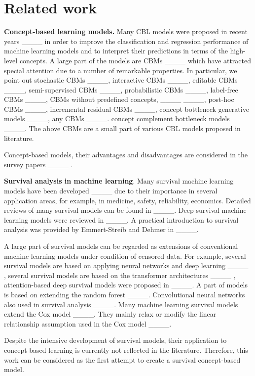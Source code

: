 \section{Related work}
\textbf{Concept-based learning models.} Many CBL models were proposed in
recent years ____
in order to improve the classification and regression performance of machine
learning models and to interpret their predictions in terms of the high-level
concepts. A large part of the models are CBMs ____ which have
attracted special attention due to a number of remarkable properties. In
particular, we point out stochastic CBMs ____,
interactive CBMs ____, editable CBMs
____, semi-supervised CBMs ____, probabilistic
CBMs ____, label-free CBMs ____,
CBMs without predefined concepts, ____
____, post-hoc CBMs ____,
incremental residual CBMs ____, concept bottleneck
generative models ____, any CBMs
____. concept complement bottleneck models
____. The above CBMs are a small part of various CBL
models proposed in literature.

Concept-based models, their advantages and disadvantages are considered in the
survey papers
____%
.

\textbf{Survival analysis in machine learning}. Many survival machine learning
models have been developed ____ due to their importance
in several application areas, for example, in medicine, safety, reliability,
economics. Detailed reviews of many survival models can be found in
____. Deep survival
machine learning models were reviewed in ____. A
practical introduction to survival analysis was provided by Emmert-Streib and
Dehmer in ____.

A large part of survival models can be regarded as extensions of conventional
machine learning models under condition of censored data. For example, several
survival models are based on applying neural networks and deep learning
____%
, several survival models are based on the transformer architectures
____%
, attention-based deep survival models were proposed in
____. A part of models is based on
extending the random forest ____.
Convolutional neural networks also used in survival analysis
____. Many machine learning survival models extend the
Cox model ____. They mainly relax or modify the linear relationship
assumption used in the Cox model
____.

Despite the intensive development of survival models, their application to
concept-based learning is currently not reflected in the literature.
Therefore, this work can be considered as the first attempt to create a
survival concept-based model.